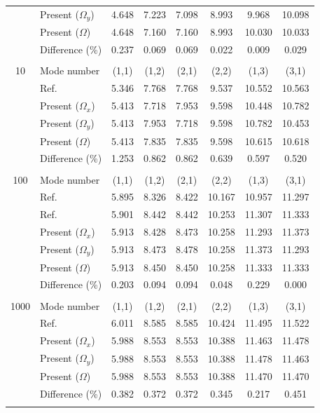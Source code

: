\documentclass[preprint,12pt,number]{elsarticle}
\begin{document}
\begin{table}[!htbp]
{\begin{tabular}{c l c c c c c c}
	& Present ($\Omega_y$)   & 4.648     & 7.223     & 7.098       & 8.993     &   9.968     & 10.098
	\\ 
	& Present ($\Omega$)   & 4.648      & 7.160   & 7.160     & 8.993    &   10.030   & 10.033   \\
	&Difference (\%)& 0.237    & 0.069      & 0.069      & 0.022     &  0.009     &0.029
	\\
	\\
	10 & Mode number   &  (1,1) & (1,2) & (2,1) & (2,2) & (1,3) & (3,1) \\
	& Ref.\Citealp{zhang2019new}  & 5.346 & 7.768 & 7.768 & 9.537 & 10.552 & 10.563 \\
	& Present ($\Omega_x$)   & 5.413      & 7.718      & 7.953     & 9.598     & 10.448      & 10.782 \\
	& Present ($\Omega_y$)   & 5.413     & 7.953     & 7.718      & 9.598    & 10.782      & 10.453
	\\ 
	& Present ($\Omega$)   &5.413      & 7.835     & 7.835     & 9.598   &  10.615    & 10.618  \\
	&Difference (\%)& 1.253     & 0.862      & 0.862      & 0.639     &  0.597     & 0.520  \\
	\\
	100 & Mode number   &  (1,1) & (1,2) & (2,1) & (2,2) & (1,3) & (3,1) \\
	& Ref.\Citealp{mukhopadhyay1979free} & 5.895& 8.326 &8.422 &10.167 &10.957 &11.297 \\
	& Ref.\Citealp{zhang2019new} & 5.901 & 8.442 & 8.442 & 10.253 & 11.307 & 11.333 \\
	& Present ($\Omega_x$)   & 5.913     & 8.428      & 8.473    & 10.258     & 11.293      & 11.373 \\
	& Present ($\Omega_y$)   & 5.913    & 8.473     & 8.478    & 10.258     & 11.373     & 11.293
	\\ 
	& Present ($\Omega$)   & 5.913     & 8.450     & 8.450     & 10.258     &  11.333    & 11.333  \\
	&Difference (\%)& 0.203     & 0.094      & 0.094      & 0.048     & 0.229     & 0.000 \\
	\\
	1000 & Mode number   & (1,1) & (1,2) & (2,1) & (2,2) & (1,3) & (3,1) \\
	& Ref.\Citealp{zhang2019new} & 6.011 & 8.585 & 8.585 & 10.424 & 11.495 & 11.522 \\
	& Present ($\Omega_x$)   & 5.988     & 8.553      & 8.553      & 10.388      & 11.463      & 11.478 \\
	& Present ($\Omega_y$)   & 5.988     & 8.553     & 8.553    & 10.388      & 11.478       & 11.463
	\\ 
	& Present ($\Omega$)   & 5.988      & 8.553    & 8.553     & 10.388    &  11.470     & 11.470  \\
	&Difference (\%)& 0.382    & 0.372      & 0.372      & 0.345     &  0.217     & 0.451
	\\
	\\
	\bottomrule
\end{tabular}
}
\label{tab:rot1}
\end{table}
\end{document}
